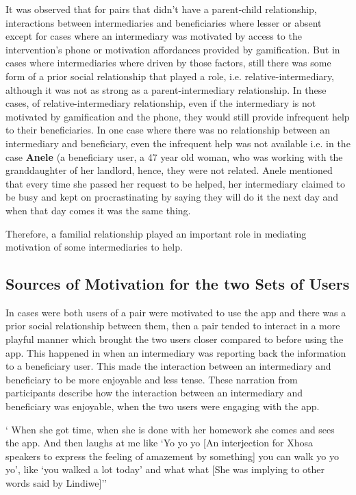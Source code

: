 It was observed that for pairs that didn't have a parent-child relationship, interactions between intermediaries and beneficiaries where lesser or absent except for cases where an intermediary was motivated by access to the intervention's phone or motivation affordances provided by gamification. But in cases where intermediaries where driven by those factors, still there was some form of a prior social relationship that played a role, i.e. relative-intermediary, although it was not as strong as a parent-intermediary relationship. In these cases, of relative-intermediary relationship, even if the intermediary is not motivated by gamification and the phone, they would still provide infrequent help to their beneficiaries.  In one case where there was no relationship between an intermediary and beneficiary, even the infrequent help was not available i.e. in the case \textbf{Anele} (a beneficiary user, a 47 year old woman, who was working with the granddaughter of her landlord, hence, they were not related. Anele mentioned that every time she passed her request to be helped, her intermediary claimed to be busy and kept on procrastinating by saying they will do it the next day and when that day comes it was the same thing. 

Therefore, a familial relationship played an important role in mediating motivation of some intermediaries to help. 
\subsection{Sources of Motivation for the two Sets of Users}
In cases were both users of a pair were motivated to use the app and there was a prior social relationship between them, then a pair tended to interact in a more playful manner which brought the two users closer compared to before using the app. This happened in  when an intermediary was reporting back the information to a beneficiary user.  This made the interaction between an intermediary and beneficiary to be more enjoyable and less tense. These narration from participants describe how the interaction  between an intermediary and beneficiary was enjoyable, when the two users were engaging with the app.

 {` When she got time, when she is done with her homework she comes and sees the app. And then laughs at me like `Yo yo yo [An interjection for Xhosa speakers to express the feeling of amazement by something] you can walk yo yo yo', like `you walked a lot today' and what what [She was implying to other words said by Lindiwe]''}

